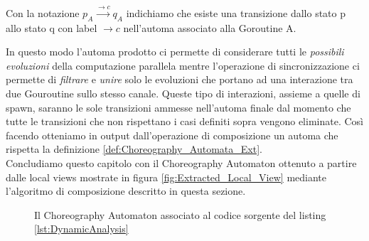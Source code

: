 \begin{remark}
    Con la notazione $p_A \xrightarrow{\rightarrow c} q_A$ indichiamo che esiste una transizione dallo stato p allo stato q con label $\rightarrow c$ nell'automa associato alla Goroutine A.
\end{remark}
In questo modo l'automa prodotto ci permette di considerare tutti le \emph{possibili evoluzioni} della computazione parallela mentre l'operazione di sincronizzazione ci permette di \emph{filtrare} e \emph{unire} solo le evoluzioni che portano ad una interazione tra due Gouroutine sullo stesso canale. Queste tipo di interazioni, assieme a quelle di spawn, saranno le sole transizioni ammesse nell'automa finale dal momento che tutte le transizioni che non rispettano i casi definiti sopra vengono eliminate. Così facendo otteniamo in output dall'operazione di composizione un automa che rispetta la definizione \ref{def:Choreography_Automata_Ext}.\bigskip \\
Concludiamo questo capitolo con il Choreography Automaton ottenuto a partire dalle local views mostrate in figura \ref{fig:Extracted_Local_View} mediante l'algoritmo di composizione descritto in questa sezione.
\begin{figure}[h!]
    \centering
    \caption{Il Choreography Automaton associato al codice sorgente del listing \ref{lst:DynamicAnalysis}}
\end{figure}